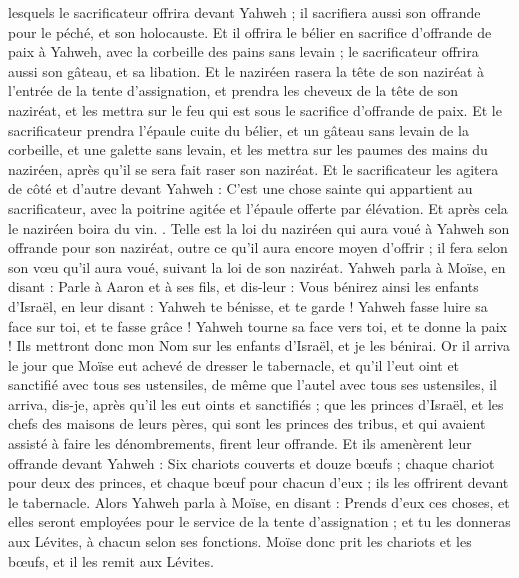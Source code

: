 \begin{multicols}{2}
lesquels le sacrificateur offrira devant Yahweh ; il sacrifiera aussi son offrande pour le péché, et son holocauste.
Et il offrira le bélier en sacrifice d'offrande de paix à Yahweh, avec la corbeille des pains sans levain ; le sacrificateur offrira aussi son gâteau, et sa libation.
Et le naziréen rasera la tête de son naziréat à l'entrée de la tente d'assignation, et prendra les cheveux de la tête de son naziréat, et les mettra sur le feu qui est sous le sacrifice d'offrande de paix.
Et le sacrificateur prendra l'épaule cuite du bélier, et un gâteau sans levain de la corbeille, et une galette sans levain, et les mettra sur les paumes des mains du naziréen, après qu'il se sera fait raser son naziréat.
Et le sacrificateur les agitera de côté et d'autre devant Yahweh : C'est une chose sainte qui appartient au sacrificateur, avec la poitrine agitée et l'épaule offerte par élévation. Et après cela le naziréen boira du vin.
.
Telle est la loi du naziréen qui aura voué à Yahweh son offrande pour son naziréat, outre ce qu'il aura encore moyen d'offrir ; il fera selon son vœu qu'il aura voué, suivant la loi de son naziréat.
Yahweh parla à Moïse, en disant :
Parle à Aaron et à ses fils, et dis-leur : Vous bénirez ainsi les enfants d'Israël, en leur disant :
Yahweh te bénisse, et te garde !
Yahweh fasse luire sa face sur toi, et te fasse grâce !
Yahweh tourne sa face vers toi, et te donne la paix !
Ils mettront donc mon Nom sur les enfants d'Israël, et je les bénirai.
\VerseOne{}Or il arriva le jour que Moïse eut achevé de dresser le tabernacle, et qu'il l'eut oint et sanctifié avec tous ses ustensiles, de même que l'autel avec tous ses ustensiles, il arriva, dis-je, après qu'il les eut oints et sanctifiés ;
que les princes d'Israël, et les chefs des maisons de leurs pères, qui sont les princes des tribus, et qui avaient assisté à faire les dénombrements, firent leur offrande.
Et ils amenèrent leur offrande devant Yahweh : Six chariots couverts et douze bœufs ; chaque chariot pour deux des princes, et chaque bœuf pour chacun d'eux ; ils les offrirent devant le tabernacle.
Alors Yahweh parla à Moïse, en disant :
Prends d'eux ces choses, et elles seront employées pour le service de la tente d'assignation ; et tu les donneras aux Lévites, à chacun selon ses fonctions.
Moïse donc prit les chariots et les bœufs, et il les remit aux Lévites.

\end{multicols}
